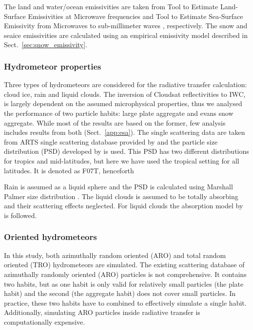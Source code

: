 \documentclass[amt, manuscript]{copernicus}
\begin{document}
The land and water/ocean emissivities are taken from Tool to Estimate Land-Surface Emissivities at Microwave frequencies  \citep[TELSEM,][]{aires2011tool} and  Tool to Estimate Sea-Surface Emissivity from Microwaves to sub-millimeter waves 
\citep[TESSEM,][]{prigent2017sea}, respectively. The snow and seaice emissivities are calculated using an empirical emissivity model described in Sect.~\ref{sec:snow_emissivity}.


\subsubsection{Hydrometeor properties}
\label{sec:hydrometeor_prop}

Three types of hydrometeors are considered for the radiative transfer calculation: cloud ice, rain and liquid clouds. The inversion of Cloudsat reflectivities to IWC, is largely dependent on the assumed microphysical properties, thus we analysed the performance of two particle habits: large plate aggregate and evans snow aggregate. While most of the results are based on the former, few analysis includes results from both (Sect.~\ref{app:esa}). The single scattering data are taken from ARTS single scattering database provided by \citet{eriksson:agene:18} and the particle size distribution (PSD) developed by \citet{field:snows:07} is used. This PSD has two different distributions for tropics and mid-latitudes, but here we have used the tropical setting for all latitudes. It is denoted as F07T, henceforth

Rain is assumed as a liquid sphere and the PSD is calculated using Marshall Palmer size distribution \citep{marshall:thedi:48}. The liquid clouds is assumed to be totally absorbing and their scattering effects neglected. For liquid clouds the absorption model by \citet{ellison2007permittivity} is followed.  


\subsubsection{Oriented hydrometeors}
\label{sec:scaling_factor}

In this study, both azimuthally random oriented (ARO) and total random oriented (TRO) hydrometeors are simulated. The existing scattering database of azimuthally randomly oriented (ARO) particles \citep{brath:micro:20} is not comprehensive. It contains two habits, but as one habit is only valid for relatively small particles (the plate habit) and the second (the aggregate habit) does not cover small particles. In practice, these two habits have to combined to effectively simulate a single habit. Additionally, simulating ARO particles inside radiative transfer is computationally expensive.
\end{document}
